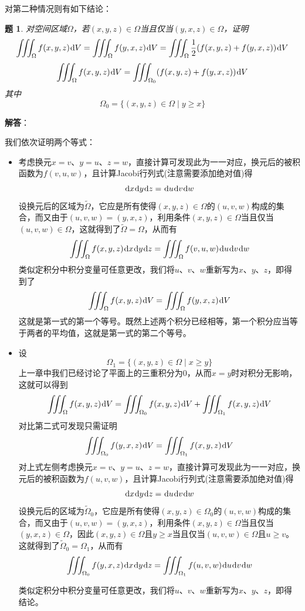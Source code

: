 \documentclass[a4paper,UTF8,fontset=windows,AutoFakeBold]{ctexart}
\newcommand*{\dr}{\hspace{0.07em}\mathrm{d}}
\theoremstyle{ex}
\newtheorem{exercise}{题}
\newcommand{\sol}[1]{{\vspace{5pt}\kaishu\noindent\textbf{解答}：\vspace{-3pt}
\begin{compactitem}
    \item[] #1
\end{compactitem}
}}
\begin{document}
对第二种情况则有如下结论：
\begin{framed}
\begin{exercise}\label{swap}
    对空间区域$\Omega$，若$(x,y,z)\in\Omega$当且仅当$(y,x,z)\in\Omega$，证明
    $$\iiint_\Omega f(x,y,z)\dr V=\iiint_\Omega f(y,x,z)\dr V=\iiint_\Omega\frac{1}{2}(f(x,y,z)+f(y,x,z))\dr V$$
    $$\iiint_\Omega f(x,y,z)\dr V=\iiint_{\Omega_0}(f(x,y,z)+f(y,x,z))\dr V$$
    其中
    $$\Omega_0=\{(x,y,z)\in\Omega\mid y\ge x\}$$
\end{exercise}
\sol{
    我们依次证明两个等式：
    \begin{itemize}
        \item 考虑换元$x=v$、$y=u$、$z=w$，直接计算可发现此为一一对应，换元后的被积函数为$f(v,u,w)$，且计算Jacobi行列式(注意需要添加绝对值)得
        $$\dr x\dr y\dr z=\dr u\dr v\dr w$$
        设换元后的区域为$\tilde\Omega$，它应是所有使得$(x,y,z)\in\Omega$的$(u,v,w)$构成的集合，而又由于$(u,v,w)=(y,x,z)$，利用条件$(x,y,z)\in\Omega$当且仅当$(u,v,w)\in\Omega$，这就得到了$\tilde\Omega=\Omega$，从而有
        $$\iiint_\Omega f(x,y,z)\dr x\dr y\dr z=\iiint_\Omega f(v,u,w)\dr u\dr v\dr w$$
        类似定积分中积分变量可任意更改，我们将$u$、$v$、$w$重新写为$x$、$y$、$z$，即得到了
        $$\iiint_\Omega f(x,y,z)\dr V=\iiint_\Omega f(y,x,z)\dr V$$
        这就是第一式的第一个等号。既然上述两个积分已经相等，第一个积分应当等于两者的平均值，这就是第一式的第二个等号。
        \item 设
        $$\Omega_1=\{(x,y,z)\in\Omega\mid x\ge y\}$$
        上一章中我们已经讨论了平面上的三重积分为0，从而$x=y$时对积分无影响，这就可以得到
        $$\iiint_\Omega f(x,y,z)\dr V=\iiint_{\Omega_0}f(x,y,z)\dr V+\iiint_{\Omega_1}f(x,y,z)\dr V$$
        对比第二式可发现只需证明
        $$\iiint_{\Omega_0}f(y,x,z)\dr V=\iiint_{\Omega_1}f(x,y,z)\dr V$$
        对上式左侧考虑换元$x=v$、$y=u$、$z=w$，直接计算可发现此为一一对应，换元后的被积函数为$f(u,v,w)$，且计算Jacobi行列式(注意需要添加绝对值)得
        $$\dr x\dr y\dr z=\dr u\dr v\dr w$$
        设换元后的区域为$\tilde\Omega_0$，它应是所有使得$(x,y,z)\in\Omega_0$的$(u,v,w)$构成的集合，而又由于$(u,v,w)=(y,x,z)$，利用条件$(x,y,z)\in\Omega$当且仅当$(y,x,z)\in\Omega$，因此$(x,y,z)\in\Omega$且$y\ge x$当且仅当$(u,v,w)\in\Omega$且$u\ge v$。这就得到了$\tilde\Omega_0=\Omega_1$，从而有
        $$\iiint_{\Omega_0}f(y,x,z)\dr x\dr y\dr z=\iiint_{\Omega_1}f(u,v,w)\dr u\dr v\dr w$$

        类似定积分中积分变量可任意更改，我们将$u$、$v$、$w$重新写为$x$、$y$、$z$，即得结论。
    \end{itemize}
}
\end{framed}
\end{document}

